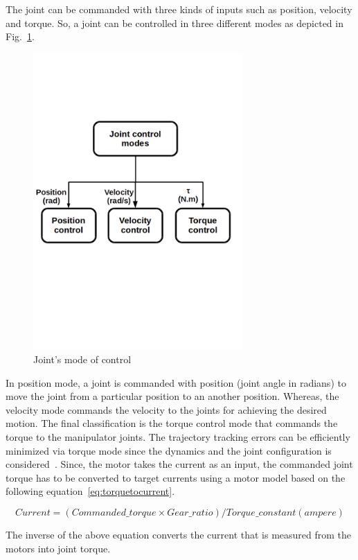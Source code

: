 The joint can be commanded with three kinds of inputs such as position, velocity and torque. So, a joint can be controlled in three different modes as depicted in Fig.~\ref{fig:modeofcontrol}.

\begin{figure}[h]
\centering
\includegraphics[width=80mm, trim=0 300 0 200]{pictures/joint_control_mode}
\caption{Joint's mode of control}
\label{fig:modeofcontrol}
\end{figure}

In position mode, a joint is commanded with position (joint angle in radians) to move the joint from a particular position to an another position. Whereas, the velocity mode commands the velocity to the joints for achieving the desired motion. The final classification is the torque control mode that commands the torque to the manipulator joints. The trajectory tracking errors can be efficiently minimized via torque mode since the dynamics and the joint configuration is considered~\cite{muggler2013torque}. Since, the motor takes the current as an input, the commanded joint torque has to be converted to target currents using a motor model based on the following equation~\eqref{eq:torquetocurrent}.

\begin{equation}
Current = (Commanded\_torque \times Gear\_ratio) / Torque\_constant (ampere)
\label{eq:torquetocurrent}
\end{equation}

The inverse of the above equation converts the current that is measured from the motors into joint torque. 

